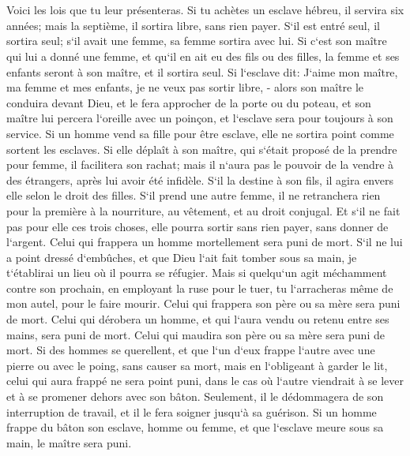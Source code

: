 \chapter{}

\verse Voici les lois que tu leur présenteras. 
\verse Si tu achètes un esclave hébreu, il servira six années; mais la septième, il sortira libre, sans rien payer. 
\verse S`il est entré seul, il sortira seul; s`il avait une femme, sa femme sortira avec lui. 
\verse Si c`est son maître qui lui a donné une femme, et qu`il en ait eu des fils ou des filles, la femme et ses enfants seront à son maître, et il sortira seul. 
\verse Si l`esclave dit: J`aime mon maître, ma femme et mes enfants, je ne veux pas sortir libre, - 
\verse alors son maître le conduira devant Dieu, et le fera approcher de la porte ou du poteau, et son maître lui percera l`oreille avec un poinçon, et l`esclave sera pour toujours à son service. 
\verse Si un homme vend sa fille pour être esclave, elle ne sortira point comme sortent les esclaves. 
\verse Si elle déplaît à son maître, qui s`était proposé de la prendre pour femme, il facilitera son rachat; mais il n`aura pas le pouvoir de la vendre à des étrangers, après lui avoir été infidèle. 
\verse S`il la destine à son fils, il agira envers elle selon le droit des filles. 
\verse S`il prend une autre femme, il ne retranchera rien pour la première à la nourriture, au vêtement, et au droit conjugal. 
\verse Et s`il ne fait pas pour elle ces trois choses, elle pourra sortir sans rien payer, sans donner de l`argent. 
\verse Celui qui frappera un homme mortellement sera puni de mort. 
\verse S`il ne lui a point dressé d`embûches, et que Dieu l`ait fait tomber sous sa main, je t`établirai un lieu où il pourra se réfugier. 
\verse Mais si quelqu`un agit méchamment contre son prochain, en employant la ruse pour le tuer, tu l`arracheras même de mon autel, pour le faire mourir. 
\verse Celui qui frappera son père ou sa mère sera puni de mort. 
\verse Celui qui dérobera un homme, et qui l`aura vendu ou retenu entre ses mains, sera puni de mort. 
\verse Celui qui maudira son père ou sa mère sera puni de mort. 
\verse Si des hommes se querellent, et que l`un d`eux frappe l`autre avec une pierre ou avec le poing, sans causer sa mort, mais en l`obligeant à garder le lit, 
\verse celui qui aura frappé ne sera point puni, dans le cas où l`autre viendrait à se lever et à se promener dehors avec son bâton. Seulement, il le dédommagera de son interruption de travail, et il le fera soigner jusqu`à sa guérison. 
\verse Si un homme frappe du bâton son esclave, homme ou femme, et que l`esclave meure sous sa main, le maître sera puni. 
